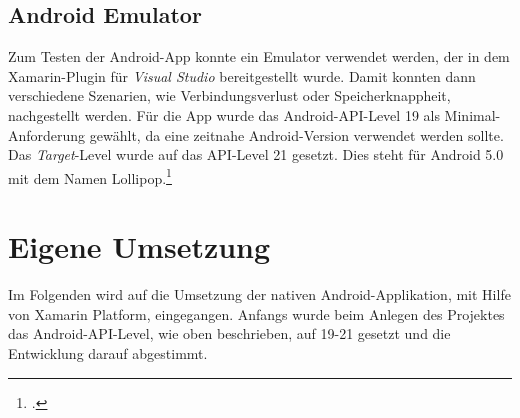 \subsection{Android Emulator}
\label{ssec:xamarin-emulator}
Zum Testen der Android-App konnte ein Emulator verwendet werden, der in dem Xamarin-Plugin für \textit{Visual Studio} bereitgestellt wurde. Damit konnten dann verschiedene Szenarien, wie Verbindungsverlust oder Speicherknappheit, nachgestellt werden. Für die App wurde das Android-API-Level 19 als Minimal-Anforderung gewählt, da eine zeitnahe Android-Version verwendet werden sollte. Das \textit{Target}-Level wurde auf das API-Level 21 gesetzt. Dies steht für Android 5.0 mit dem Namen Lollipop.\footcite{Xamarin-API}
\section{Eigene Umsetzung}
\label{sec:nat-umsetzung}
Im Folgenden wird auf die Umsetzung der nativen Android-Applikation, mit Hilfe von Xamarin Platform, eingegangen. Anfangs wurde beim Anlegen des Projektes das Android-API-Level, wie oben beschrieben, auf 19-21 gesetzt und die Entwicklung darauf abgestimmt.

